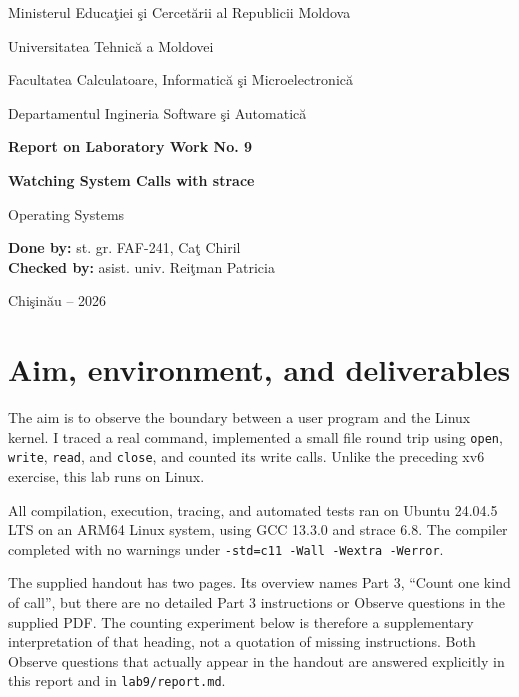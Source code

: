\documentclass[12pt]{article}
\begin{document}
\begin{titlepage}
\centering
{\large Ministerul Educa\c{t}iei \c{s}i Cercet\u{a}rii al Republicii Moldova\par}
\vspace{0.45cm}
{\large Universitatea Tehnic\u{a} a Moldovei\par}
\vspace{0.45cm}
{\large Facultatea Calculatoare, Informatic\u{a} \c{s}i Microelectronic\u{a}\par}
\vspace{0.45cm}
{\large Departamentul Ingineria Software \c{s}i Automatic\u{a}\par}
\vspace{3cm}
{\Large\bfseries Report on Laboratory Work No. 9\par}
\vspace{0.55cm}
{\LARGE\bfseries Watching System Calls with strace\par}
\vspace{0.35cm}
{\large Operating Systems\par}
\vfill
\begin{flushleft}
\textbf{Done by:} st. gr. FAF-241, Ca\c{t} Chiril\\[0.8cm]
\textbf{Checked by:} asist. univ. Rei\c{t}man Patricia
\end{flushleft}
\vfill
{Chi\c{s}in\u{a}u -- 2026\par}
\end{titlepage}
\tableofcontents
\clearpage
{}

\section{Aim, environment, and deliverables}
The aim is to observe the boundary between a user program and the Linux
kernel. I traced a real command, implemented a small file round trip using
\texttt{open}, \texttt{write}, \texttt{read}, and \texttt{close}, and counted
its write calls. Unlike the preceding xv6 exercise, this lab runs on Linux.

All compilation, execution, tracing, and automated tests ran on Ubuntu
24.04.5 LTS on an ARM64 Linux system, using GCC 13.3.0 and strace 6.8.
The compiler completed with no warnings under
\texttt{-std=c11 -Wall -Wextra -Werror}.

The supplied handout has two pages. Its overview names Part 3, ``Count one
kind of call'', but there are no detailed Part 3 instructions or Observe
questions in the supplied PDF. The counting experiment below is therefore
a supplementary interpretation of that heading, not a quotation of missing
instructions. Both Observe questions that actually appear in the handout
are answered explicitly in this report and in \texttt{lab9/report.md}.
\end{document}
